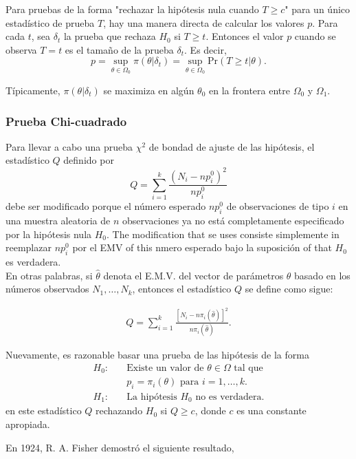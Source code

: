 \documentclass{book}
\begin{document}
Para pruebas de la forma "rechazar la hipótesis nula cuando $T \geq c$" para un único estadístico de prueba $T$, hay una manera directa de calcular los valores $p$. 
Para cada $t$, sea $\delta_t$ la prueba que rechaza $H_0$ si $T \geq t$. Entonces el valor $p$ cuando se observa $T = t$ es el tamaño de la prueba $\delta_t$.
Es decir,
\begin{equation}
p = \sup_{\theta \in \Omega_0} \pi(\theta|\delta_t) = \sup_{\theta \in \Omega_0} \text{Pr}(T \geq t|\theta).
\end{equation}

Típicamente, $\pi(\theta|\delta_t)$ se maximiza en algún $\theta_0$ en la frontera entre $\Omega_0$ y $\Omega_1$.


\subsubsection{Prueba Chi-cuadrado}
Para llevar a cabo una prueba $\chi^2$ de bondad de ajuste de las hipótesis, el estadístico $Q$ definido por 
$$Q = \sum_{i=1}^{k} \frac{(N_i - np_i^0)^2}{np_i^0}$$
debe ser modificado porque el número esperado $np_i^0$ de observaciones de tipo $i$ en una muestra aleatoria de $n$ observaciones ya no está completamente especificado por la hipótesis nula $H_0$. The modification that se uses consiste simplemente in reemplazar $np_i^0$ por el EMV of this nmero esperado bajo la suposición of that $H_0$ es verdadera.\\
En otras palabras, si $\hat{\theta}$ denota el E.M.V. del vector de parámetros $\theta$ basado en los números observados $N_1, \ldots, N_k$, entonces el estadístico $Q$ se define como sigue:

\begin{align} \label{Q_chi_test}
Q = \sum_{i=1}^{k} \frac{[N_i - n\pi_i(\hat{\theta})]^2}{n\pi_i(\hat{\theta})}.
\end{align}

Nuevamente, es razonable basar una prueba de las hipótesis de la forma
\begin{align} \label{pruebaH}
H_0: \quad &\text{Existe un valor de } \theta \in \Omega \text{ tal que}\\
&p_i = \pi_i(\theta) \text{ para } i = 1, \ldots, k.\\
H_1: \quad &\text{La hipótesis } H_0 \text{ no es verdadera.}
\end{align}
en este estadístico $Q$ rechazando $H_0$ si $Q \geq c$, donde $c$ es una constante apropiada. 

En 1924, R. A. Fisher demostró el siguiente resultado,
\end{document}
